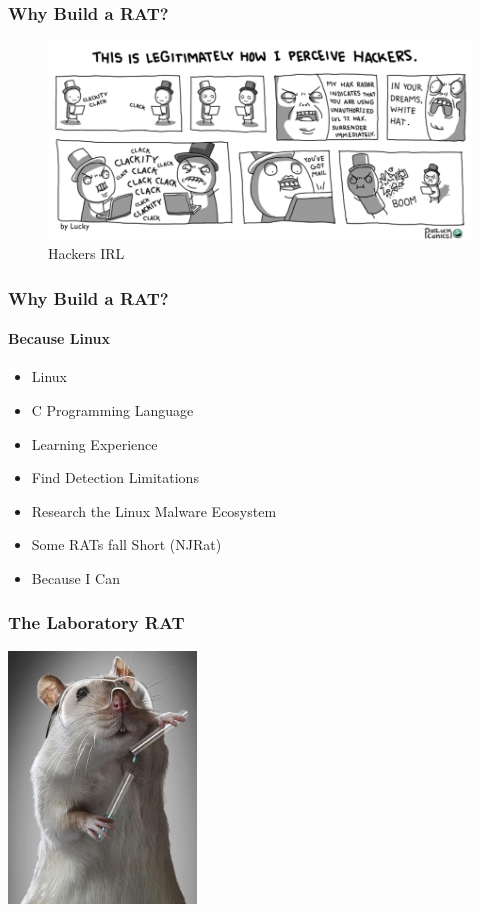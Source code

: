 \documentclass[aspectratio=169]{beamer}
\begin{document}
\begin{frame}
  \frametitle{Why Build a RAT?}
  \begin{center}
    \begin{figure}
      \includegraphics[width=12cm,keepaspectratio]{hackers_meme}
      \caption{Hackers IRL}
    \end{figure}
  \end{center}
\end{frame}

\begin{frame}
  \frametitle{Why Build a RAT?}
  \framesubtitle{Because Linux}
  \begin{itemize}
  \item{Linux}
  \item{C Programming Language}
  \item{Learning Experience}
  \item{Find Detection Limitations}
  \item{Research the Linux Malware Ecosystem}
  \item{Some RATs fall Short (NJRat)}
  \item{Because I Can}
  \end{itemize}
\end{frame}

\begin{frame}
  \frametitle{The Laboratory RAT}
  \begin{center}
    \includegraphics[width=5cm,keepaspectratio]{lab_rat}
  \end{center}
\end{frame}
\end{document}
